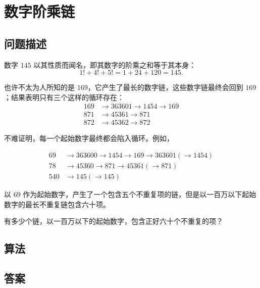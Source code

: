 \section{数字阶乘链}
\subsection{问题描述}
\begin{tcolorbox}

	数字 $145$ 以其性质而闻名，即其数字的阶乘之和等于其本身：
	\[1! + 4! + 5! = 1 + 24 + 120 = 145.\]

	也许不太为人所知的是 $169$，它产生了最长的数字链，这些数字链最终会回到 $169$；结果表明只有三个这样的循环存在：
	\begin{align*}
		169 & \rightarrow 363601 \rightarrow 1454 \rightarrow 169 \\
		871 & \rightarrow 45361 \rightarrow 871                   \\
		872 & \rightarrow 45362 \rightarrow 872
	\end{align*}

	不难证明，每一个起始数字最终都会陷入循环。例如，

	\begin{align*}
		69  & \rightarrow 363600 \rightarrow 1454 \rightarrow 169 \rightarrow 363601 (\rightarrow 1454) \\
		78  & \rightarrow 45360 \rightarrow 871 \rightarrow 45361 (\rightarrow 871)                     \\
		540 & \rightarrow 145 (\rightarrow 145)
	\end{align*}

	以 $69$ 作为起始数字，产生了一个包含五个不重复项的链，但是以一百万以下起始数字的最长不重复链包含六十项。

	有多少个链，以一百万以下的起始数字，包含正好六十个不重复的项？
\end{tcolorbox}

\subsection{算法}

\subsection{答案}
